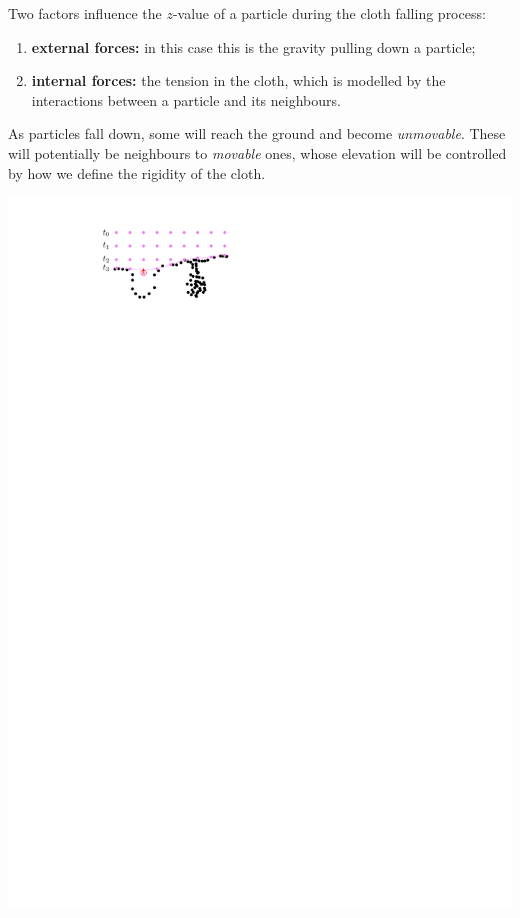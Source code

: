 Two factors influence the $z$-value of a particle during the cloth falling process:
\begin{enumerate}
  \item \textbf{external forces:} in this case this is the gravity pulling down a particle;
  \item \textbf{internal forces:} the tension in the cloth, which is modelled by the interactions between a particle and its neighbours.
\end{enumerate}
As particles fall down, some will reach the ground and become \emph{unmovable}.
These will potentially be neighbours to \emph{movable} ones, whose elevation will be controlled by how we define the rigidity of the cloth.

\begin{marginfigure}
  \centering
  \includegraphics[width=\linewidth]{csf_iterations}
  \caption{}%
\label{fig:csf_iterations}
\end{marginfigure}

